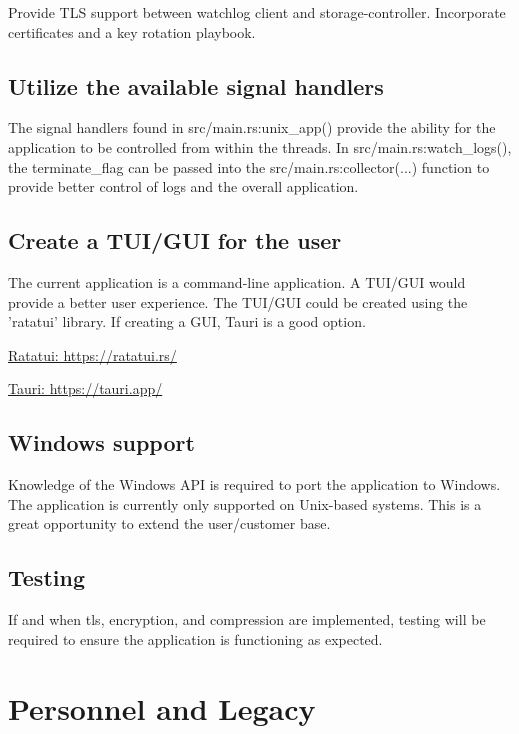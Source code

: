 \documentclass{article}
\begin{document}
Provide TLS support between watchlog client and storage-controller. Incorporate certificates and a key rotation playbook.

\subsection{Utilize the available signal handlers}

The signal handlers found in src/main.rs:unix\_app() provide the ability for the application to be controlled from within the threads. In src/main.rs:watch\_logs(), the terminate\_flag can be passed into the src/main.rs:collector(...) function to provide better control of logs and the overall application.

\subsection{Create a TUI/GUI for the user}

The current application is a command-line application. A TUI/GUI would provide a better user experience. The TUI/GUI could be created using the 'ratatui' library. If creating a GUI, Tauri is a good option.\vspace{0.25cm}

\href{https://ratatui.rs/}{Ratatui: https://ratatui.rs/}

\href{https://tauri.app/}{Tauri: https://tauri.app/}

\subsection{Windows support}

Knowledge of the Windows API is required to port the application to Windows. The application is currently only supported on Unix-based systems. This is a great opportunity to extend the user/customer base.

\subsection{Testing}

If and when tls, encryption, and compression are implemented, testing will be required to ensure the application is functioning as expected. 

\newpage

\section{Personnel and Legacy}
\end{document}
